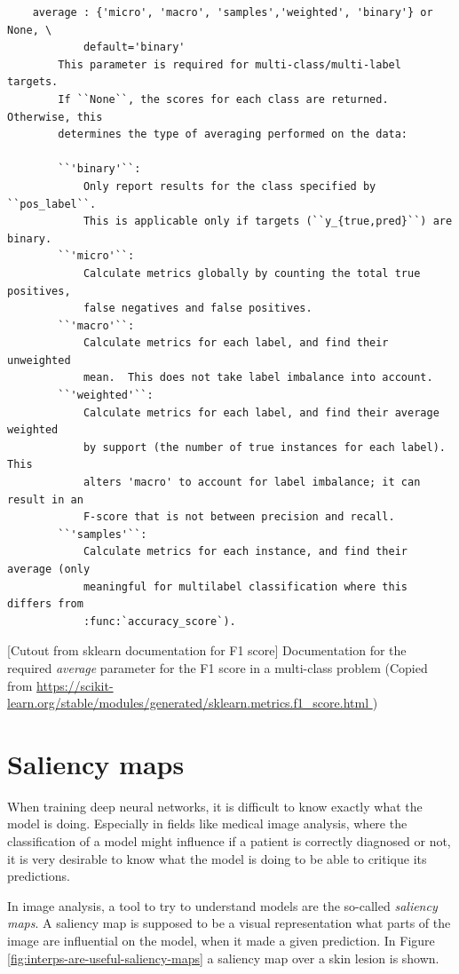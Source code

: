 \begin{center}
    \begin{verbatim}
    average : {'micro', 'macro', 'samples','weighted', 'binary'} or None, \
            default='binary'
        This parameter is required for multi-class/multi-label targets.
        If ``None``, the scores for each class are returned. Otherwise, this
        determines the type of averaging performed on the data:

        ``'binary'``:
            Only report results for the class specified by ``pos_label``.
            This is applicable only if targets (``y_{true,pred}``) are binary.
        ``'micro'``:
            Calculate metrics globally by counting the total true positives,
            false negatives and false positives.
        ``'macro'``:
            Calculate metrics for each label, and find their unweighted
            mean.  This does not take label imbalance into account.
        ``'weighted'``:
            Calculate metrics for each label, and find their average weighted
            by support (the number of true instances for each label). This
            alters 'macro' to account for label imbalance; it can result in an
            F-score that is not between precision and recall.
        ``'samples'``:
            Calculate metrics for each instance, and find their average (only
            meaningful for multilabel classification where this differs from
            :func:`accuracy_score`).
    \end{verbatim}
    [Cutout from sklearn documentation for F1 score]{
        Documentation for the required \textit{average} parameter for the F1 score in a multi-class problem
        (Copied from \url{https://scikit-learn.org/stable/modules/generated/sklearn.metrics.f1_score.html
        })}
    \label{fig:sklearn-f1-average-docs}
\end{center}

\section{Saliency maps}\label{sec:saliency_maps}
When training deep neural networks,
it is difficult to know exactly what the model is doing.
Especially in fields like medical image analysis,
where the classification of a model might influence if a patient is correctly diagnosed or not,
it is very desirable to know what the model is doing to be able to critique its predictions.

In image analysis, a tool to try to understand models are the so-called \textit{saliency maps}.
A saliency map is supposed to be a visual representation what parts of the image are influential on the model,
when it made a given prediction.
In Figure \ref{fig:interps-are-useful-saliency-maps} a saliency map over a skin lesion is shown. 


